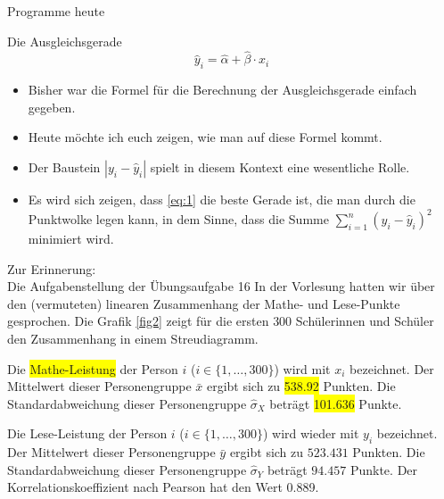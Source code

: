 \documentclass[usenames,dvipsnames,handout]{beamer}
\begin{document}
\begin{frame}{Programme heute}
\begin{block}{Die Ausgleichsgerade}
\begin{equation}
\label{eq:1}
\hat{y}_{i} = \hat{\alpha} + \hat{\beta} \cdot x_{i} 
\end{equation}
\end{block}
\begin{itemize}
\item{Bisher war die Formel für die Berechnung der Ausgleichsgerade einfach gegeben.}
\item{Heute möchte ich euch zeigen, wie man auf diese Formel kommt.}
\item{Der Baustein $|y_{i}-\hat{y}_{i}|$ spielt in diesem Kontext eine wesentliche Rolle.}
\item{Es wird sich zeigen, dass  \eqref{eq:1} die beste Gerade ist,
die man durch die Punktwolke legen kann, in dem Sinne, dass 
die Summe $\sum_{i=1}^{n}(y_{i}-\hat{y}_{i})^{2}$
minimiert wird. }
\end{itemize}

\end{frame}

\begin{frame}{Zur Erinnerung:\\ Die Aufgabenstellung der Übungsaufgabe 16}
In der Vorlesung hatten wir über den (vermuteten) linearen Zusammenhang der Mathe- und Lese-Punkte gesprochen. Die Grafik \ref{fig2} zeigt für die ersten $300$
Schülerinnen und Schüler den Zusammenhang in einem Streudiagramm. 

Die  \colorbox{yellow}{Mathe-Leistung} der Person $i$ ($i \in \{1,\dots,300\}$) wird mit $x_{i}$
bezeichnet. Der Mittelwert dieser Personengruppe $\bar{x}$ ergibt sich zu \colorbox{yellow}{538.92} Punkten. Die Standardabweichung
dieser Personengruppe $\hat{\sigma}_{X}$ beträgt \colorbox{yellow}{101.636} Punkte.

\vspace{0.5cm}

Die  \colorbox{green!30}{Lese-Leistung} der Person $i$ ($i \in \{1,\dots,300\}$) wird wieder  mit $y_{i}$
bezeichnet. Der Mittelwert dieser Personengruppe $\bar{y}$ ergibt sich zu \colorbox{green!30}{$523.431$} Punkten. Die Standardabweichung dieser Personengruppe $\hat{\sigma}_{Y}$ beträgt 
\colorbox{green!30}{$94.457$} Punkte.
Der \colorbox{red!30}{Korrelationskoeffizient nach Pearson} hat den Wert \colorbox{red!30}{0.889.}
\end{frame}
\end{document}
